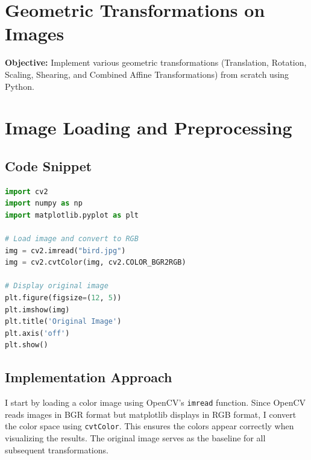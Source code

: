 \documentclass[12pt,a4paper]{report}
\begin{document}
\pagestyle{fancy}
\tableofcontents
\newpage

\section*{Geometric Transformations on Images}
\textbf{Objective:} Implement various geometric transformations (Translation, Rotation, Scaling, Shearing, and Combined Affine Transformations) from scratch using Python.

\vspace{0.5cm}

\setcounter{section}{0}

\section{Image Loading and Preprocessing}

\subsection{Code Snippet}
\begin{lstlisting}[language=Python, caption={Loading and Displaying Original Image}]
import cv2
import numpy as np
import matplotlib.pyplot as plt

# Load image and convert to RGB
img = cv2.imread("bird.jpg")
img = cv2.cvtColor(img, cv2.COLOR_BGR2RGB)

# Display original image
plt.figure(figsize=(12, 5))
plt.imshow(img)
plt.title('Original Image')
plt.axis('off')
plt.show()
\end{lstlisting}

\subsection{Implementation Approach}
I start by loading a color image using OpenCV's \texttt{imread} function. Since OpenCV reads images in BGR format but matplotlib displays in RGB format, I convert the color space using \texttt{cvtColor}. This ensures the colors appear correctly when visualizing the results. The original image serves as the baseline for all subsequent transformations.

\end{document}

